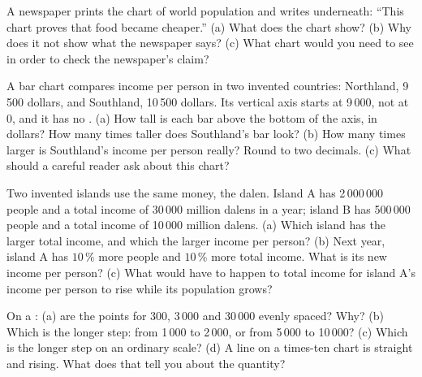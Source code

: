 \begin{exercise}[$\star\star$]\label{exo:g6:reading-economic-charts:8}
A newspaper prints the chart of world population and writes underneath:
``This chart proves that food became cheaper.'' (a) What does the chart show?
(b) Why does it not show what the newspaper says? (c) What chart would you
need to see in order to check the newspaper's claim?
\end{exercise}

\begin{exercise}[$\star\star$]\label{exo:g6:reading-economic-charts:9}
A bar chart compares income per person in two invented countries: Northland,
9\,500 dollars, and Southland, 10\,500 dollars. Its vertical axis starts at
9\,000, not at 0, and it has no . (a) How tall is each bar above
the bottom of the axis, in dollars? How many times taller does Southland's bar
look? (b) How many times larger is Southland's income per person really? Round
to two decimals. (c) What should a careful reader ask about this chart?
\end{exercise}

\begin{exercise}[$\star\star\star$]\label{exo:g6:reading-economic-charts:10}
Two invented islands use the same money, the dalen. Island A has
2\,000\,000 people and a total income of 30\,000 million dalens in a year;
island B has 500\,000 people and a total income of 10\,000 million dalens.
(a) Which island has the larger total income, and which the larger income per
person? (b) Next year, island A has $10\,\%$ more people and $10\,\%$ more total
income. What is its new income per person? (c) What would have to happen to
total income for island A's income per person to rise while its population
grows?
\end{exercise}

\begin{exercise}[$\star\star\star$]\label{exo:g6:reading-economic-charts:11}
On a : (a) are the points for 300, 3\,000 and 30\,000 evenly
spaced? Why? (b) Which is the longer step: from 1\,000 to 2\,000, or from
5\,000 to 10\,000? (c) Which is the longer step on an ordinary scale? (d) A
line on a times-ten chart is straight and rising. What does that tell you about
the quantity?
\end{exercise}

